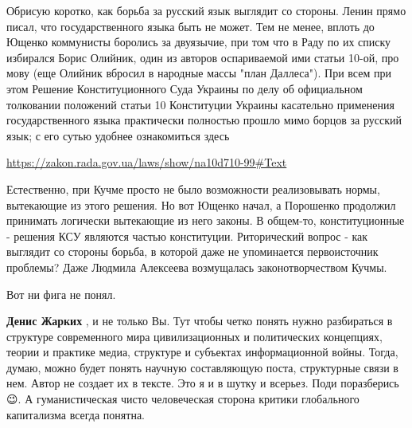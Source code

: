 \begin{itemize}
 

Обрисую коротко, как борьба за русский язык выглядит со стороны. Ленин прямо
писал, что государственного языка быть не может. Тем не менее, вплоть до Ющенко
коммунисты боролись за двуязычие, при том что в Раду по их списку избирался
Борис Олийник, один из авторов оспариваемой ими статьи 10-ой, про мову (еще
Олийник вбросил в народные массы "план Даллеса"). При всем при этом Решение
Конституционного Суда Украины по делу об официальном толковании положений
статьи 10 Конституции Украины касательно применения государственного языка
практически полностью прошло мимо борцов за русский язык; с его сутью удобнее
ознакомиться здесь

\url{https://zakon.rada.gov.ua/laws/show/na10d710-99#Text}

 

Естественно, при Кучме просто не было возможности реализовывать нормы,
вытекающие из этого решения. Но вот Ющенко начал, а Порошенко продолжил
принимать логически вытекающие из него законы. В общем-то, конституционные -
решения КСУ являются частью конституции. Риторический вопрос - как выглядит со
стороны борьба, в которой даже не упоминается первоисточник проблемы? Даже
Людмила Алексеева возмущалась законотворчеством Кучмы.

 
Вот ни фига не понял.

\begin{itemize}
 
\textbf{Денис Жарких} , и не только Вы. Тут чтобы четко понять нужно
разбираться в структуре современного мира цивилизационных и политических
концепциях, теории и практике медиа, структуре и субъектах информационной
войны. Тогда, думаю, можно будет понять научную составляющую поста, структурные
связи в нем. Автор не создает их в тексте. Это я и в шутку и всерьез. Поди
поразберись 😉. А гуманистическая чисто человеческая сторона критики
глобального капитализма всегда понятна.


\end{itemize}
\end{itemize}
